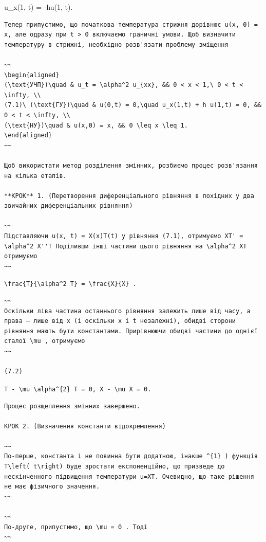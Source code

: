\documentclass[
  ukrainian,
]{article}
\begin{document}
u\_x(1, t) = -hu(1, t).

\begin{verbatim}
Тепер припустимо, що початкова температура стрижня дорівнює u(x, 0) = x, але одразу при t > 0 включаємо граничні умови. Щоб визначити температуру в стрижні, необхідно розв'язати проблему зміщення

~~
\begin{aligned}
(\text{УЧП})\quad & u_t = \alpha^2 u_{xx}, && 0 < x < 1,\ 0 < t < \infty, \\
(7.1)\ (\text{ГУ})\quad & u(0,t) = 0,\quad u_x(1,t) + h u(1,t) = 0, && 0 < t < \infty, \\
(\text{НУ})\quad & u(x,0) = x, && 0 \leq x \leq 1.
\end{aligned}
~~

Щоб використати метод розділення змінних, розбиємо процес розв'язання на кілька етапів.

**КРОК** 1. (Перетворення диференціального рівняння в похідних у два звичайних диференціальних рівняння)

~~
Підставляючи u(x, t) = X(x)T(t) у рівняння (7.1), отримуємо XT' = \alpha^2 X''T Поділивши інші частини цього рівняння на \alpha^2 XT отримуємо
~~
\end{verbatim}

\texttt{\textbackslash{}frac\{T\textquotesingle{}\}\{\textbackslash{}alpha\^{}2\ T\}\ =\ \textbackslash{}frac\{X\textquotesingle{}\textquotesingle{}\}\{X\}\ .}

\begin{verbatim}
~~
Оскільки ліва частина останнього рівняння залежить лише від часу, а права — лише від x (і оскільки x і t незалежні), обидві сторони рівняння мають бути константами. Прирівнюючи обидві частини до однієї сталої \mu , отримуємо
~~

(7.2)
\end{verbatim}

\texttt{T\textquotesingle{}\ -\ \textbackslash{}mu\ \textbackslash{}alpha\^{}\{2\}\ T\ =\ 0,\ X\textquotesingle{}\textquotesingle{}\ -\ \textbackslash{}mu\ X\ =\ 0.}

\begin{verbatim}
Процес розщеплення змінних завершено.

КРОК 2. (Визначення константи відокремлення)

~~
По-перше, константа і не повинна бути додатною, інакше ^{1} ) функція T\left( t\right) буде зростати експоненційно, що призведе до нескінченного підвищення температури u=XT. Очевидно, що таке рішення не має фізичного значення.
~~

~~
По-друге, припустимо, що \mu = 0 . Тоді
~~
\end{verbatim}
\end{document}
